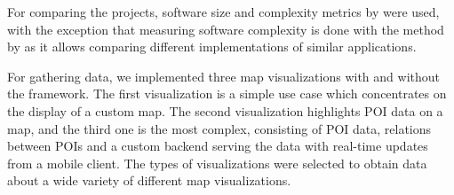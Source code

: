 For comparing the projects, software size and complexity metrics by \citet{fenton_software_1998} were used, with the exception that measuring software complexity is done with the method by \citet{mccabe_complexity_1976} as it allows comparing different implementations of similar applications. 

For gathering data, we implemented three  map visualizations with and without the framework. The first visualization is a simple use case which concentrates on the display of a custom map. The second visualization highlights POI data on a map, and the third one is the most complex, consisting of POI data, relations between POIs and a custom backend serving the data with real-time updates from a mobile client. The types of visualizations were selected to obtain data about a wide variety of different map visualizations. 






